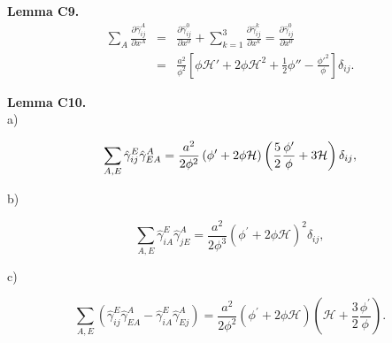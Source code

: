 \documentclass[aps,superscriptaddress, showpacs,preprintnumbers, superscriptaddress, nofootinbibt,twocolumn]{revtex4-2}
\begin{document}
{\bf Lemma C9.}
\begin{eqnarray*}
     \sum_A
    \frac{\partial \hat{\gamma}^A_{ij}}{\partial x^A}&=&
    \frac{\partial \hat{\gamma}^0_{ij}}{\partial x^0}+
    \sum_{k=1}^3\frac{\partial \hat{\gamma}^k_{ij}}{\partial x^k}=
    \frac{\partial\hat{\gamma}^0_{ij}}{\partial x^0}\nonumber\\
    &=&\frac{a^{2}}{\phi ^{2}}
    \left[
\phi\mathcal{H}'+2\phi\mathcal{H}^2+\frac{1}{2}\phi''-\frac{\phi'^2}{\phi}
    \right]\delta_{ij}.
\end{eqnarray*}

{\bf Lemma C10.}\\

a)

\begin{equation*}
\sum_{A,E}\hat{\gamma}_{ij}^{E}\hat{\gamma}_{EA}^{A}=\frac{a^{2}}{2\phi ^{2}}\left( \phi ^{\prime }+2\phi \mathcal{H}\right) \left( \frac{%
5}{2}\frac{\phi ^{\prime }}{\phi }+3\mathcal{H}\right)\delta _{ij} ,
\end{equation*}

b)

\begin{equation*}
\sum_{A,E}\hat{\gamma}_{iA}^{E}\hat{\gamma}_{jE}^{A}=\frac{a^{2}}{2\phi ^{3}}\left( \phi ^{\prime }+2\phi \mathcal{H}\right) ^{2}\delta _{ij},
\end{equation*}

c)

\begin{equation*}
\sum_{A,E}
    \left(\hat{\gamma}_{ij}^E\hat{\gamma}^A_{EA}-\hat{\gamma}_{iA}^E\hat{\gamma}^A_{Ej}
    \right)=\frac{a^{2}}{2\phi ^{2}}\left( \phi ^{\prime }+2\phi \mathcal{H}\right) \left( \mathcal{H}+%
\frac{3}{2}\frac{\phi ^{\prime }}{\phi }\right).
\end{equation*}
\smallskip



\end{document}
